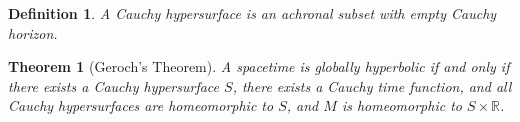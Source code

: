 \documentclass{article}
\theoremstyle{plain}
\newtheorem{theorem}{Theorem}[section]
\theoremstyle{thmit}
\theoremstyle{normal}
\newtheorem{definition}{Definition}[section]
\begin{document}
        \begin{definition}
            A Cauchy hypersurface is an achronal subset with empty
            Cauchy horizon.
        \end{definition}
        \begin{theorem}[Geroch's Theorem]
            A spacetime is globally hyperbolic if and only if there exists a
            Cauchy hypersurface $S$, there exists a Cauchy time function, and
            all Cauchy hypersurfaces are homeomorphic to $S$, and $M$ is
            homeomorphic to $S\times\mathbb{R}$.
        \end{theorem}
\end{document}
